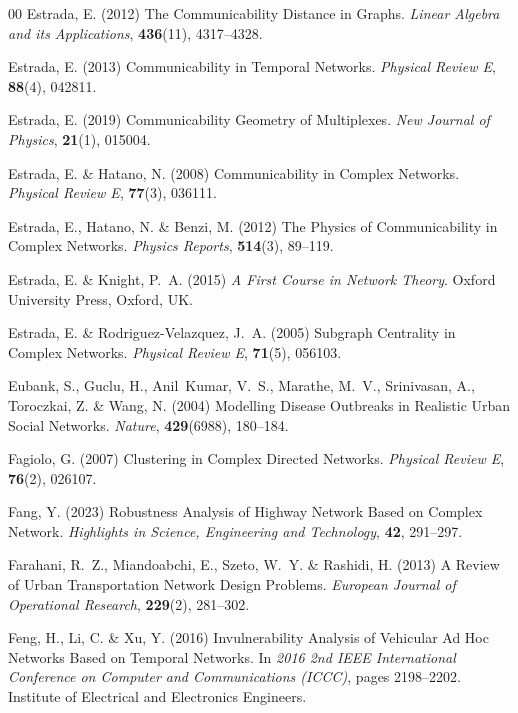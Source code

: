 \documentclass{comnet-mod}
\begin{document}
\begin{thebibliography}{00}
Estrada, E. (2012)  {The Communicability Distance in Graphs}. {\em {Linear
  Algebra and its Applications}}, \textbf{436}(11), 4317--4328.

Estrada, E. (2013)  {Communicability in Temporal Networks}. {\em {Physical
  Review E}}, \textbf{88}(4), 042811.

Estrada, E. (2019)  {Communicability Geometry of Multiplexes}. {\em {New
  Journal of Physics}}, \textbf{21}(1), 015004.

Estrada, E. {\&} Hatano, N. (2008)  {Communicability in Complex Networks}. {\em
  {Physical Review E}}, \textbf{77}(3), 036111.

Estrada, E., Hatano, N. {\&} Benzi, M. (2012)  The Physics of Communicability
  in Complex Networks. {\em {Physics Reports}}, \textbf{514}(3), 89--119.

Estrada, E. {\&} Knight, P.~A. (2015) {\em {A First Course in Network Theory}}.
{Oxford University Press}, {Oxford, UK}.

Estrada, E. {\&} {Rodriguez-Velazquez}, J.~A. (2005)  {Subgraph Centrality in
  Complex Networks}. {\em {Physical Review E}}, \textbf{71}(5), 056103.

Eubank, S., Guclu, H., Anil~Kumar, V.~S., Marathe, M.~V., Srinivasan, A.,
  Toroczkai, Z. {\&} Wang, N. (2004)  {Modelling Disease Outbreaks in Realistic
  Urban Social Networks}. {\em {Nature}}, \textbf{429}(6988), 180--184.

Fagiolo, G. (2007)  {Clustering in Complex Directed Networks}. {\em {Physical
  Review E}}, \textbf{76}(2), 026107.

Fang, Y. (2023)  {Robustness Analysis of Highway Network Based on Complex
  Network}. {\em {Highlights in Science, Engineering and Technology}},
  \textbf{42}, 291--297.

Farahani, R.~Z., Miandoabchi, E., Szeto, W.~Y. {\&} Rashidi, H. (2013)  {A
  Review of Urban Transportation Network Design Problems}. {\em {European
  Journal of Operational Research}}, \textbf{229}(2), 281--302.

Feng, H., Li, C. {\&} Xu, Y. (2016)  {Invulnerability Analysis of Vehicular Ad
  Hoc Networks Based on Temporal Networks}. In {\em {2016 2nd {{IEEE}}
  International Conference on Computer and Communications ({{ICCC}})}}, pages
  2198--2202. {Institute of Electrical and Electronics Engineers}.


\end{thebibliography}
\end{document}
